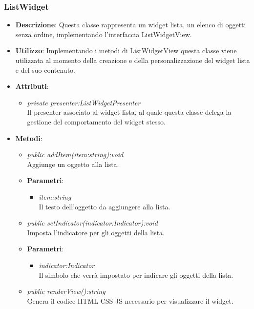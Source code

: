 \subsubsection{ListWidget}
\begin{itemize}
\item \textbf{Descrizione}: Questa classe rappresenta un widget lista, un elenco di oggetti senza ordine, implementando l'interfaccia ListWidgetView.
\item \textbf{Utilizzo}: Implementando i metodi di ListWidgetView questa classe viene utilizzata al momento della creazione e della personalizzazione del widget lista e del suo contenuto.
\item \textbf{Attributi}:
	\begin{itemize}
	\item \textit{private presenter:ListWidgetPresenter}\\
	Il presenter associato al widget lista, al quale questa classe delega la gestione del comportamento del widget stesso.
	\end{itemize}
\item \textbf{Metodi}:
	\begin{itemize}
	\item \textit{public addItem(item:string):void}\\
	Aggiunge un oggetto alla lista.
		\item{\textbf{Parametri}: \begin{itemize}
		\item \textit{item:string}\\
		Il testo dell'oggetto da aggiungere alla lista.
		\end{itemize}}
	\item \textit{public setIndicator(indicator:Indicator):void}\\
	Imposta l'indicatore per gli oggetti della lista.
		\item{\textbf{Parametri}: \begin{itemize}
		\item \textit{indicator:Indicator}\\
		Il simbolo che verrà impostato per indicare gli oggetti della lista.
		\end{itemize}}
	\item \textit{public renderView():string}\\
	Genera il codice HTML CSS JS necessario per visualizzare il widget.
	\end{itemize}
\end{itemize}

